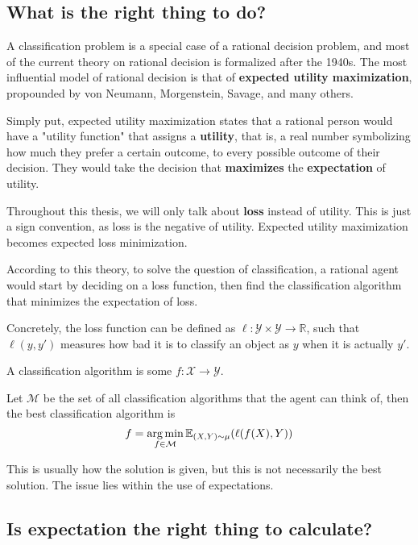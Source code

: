 \subsection{What is the right thing to do?}
A classification problem is a special case of a rational decision problem, and most of the current theory on rational decision is formalized after the 1940s. The most influential model of rational decision is that of \textbf{expected utility maximization}, propounded by von Neumann, Morgenstein, Savage, and many others.

Simply put, expected utility maximization states that a rational person would have a "utility function" that assigns a \textbf{utility}, that is, a real number symbolizing how much they prefer a certain outcome, to every possible outcome of their decision. They would take the decision that \textbf{maximizes} the \textbf{expectation} of utility.

\begin{conv}
	Throughout this thesis, we will only talk about \textbf{loss} instead of utility. This is just a sign convention, as loss is the negative of utility. Expected utility maximization becomes expected loss minimization.
\end{conv}

According to this theory, to solve the question of classification, a rational agent would start by deciding on a loss function, then find the classification algorithm that minimizes the expectation of loss. 

Concretely, the loss function can be defined as $\ell: \mathcal{Y} \times \mathcal{Y} \to \mathbb{R}$, such that $\ell(y, y')$ measures how bad it is to classify an object as $y$ when it is actually $y'$. 

A classification algorithm is some $f: \mathcal{X} \to \mathcal{Y}$. 

Let $\mathcal{M}$ be the set of all classification algorithms that the agent can think of, then the best classification algorithm is 
\begin{equation}
f = \operatorname*{arg\,min}_{f\in\mathcal{M}}\mathbb{E}_{(X, Y)\sim \mu}(\ell(f(X), Y))
\end{equation}

This is usually how the solution is given, but this is not necessarily the best solution. The issue lies within the use of expectations.

\subsection{Is expectation the right thing to calculate?}

